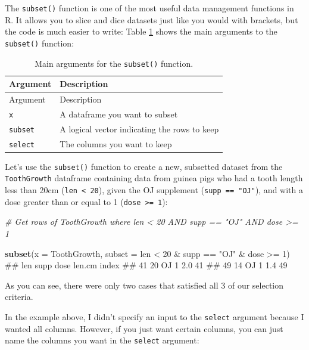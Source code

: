 \documentclass[]{book}
\newenvironment{Shaded}{\begin{snugshade}}{\end{snugshade}}
\newcommand{\KeywordTok}[1]{\textcolor[rgb]{0.13,0.29,0.53}{\textbf{{#1}}}}
\newcommand{\DataTypeTok}[1]{\textcolor[rgb]{0.13,0.29,0.53}{{#1}}}
\newcommand{\DecValTok}[1]{\textcolor[rgb]{0.00,0.00,0.81}{{#1}}}
\newcommand{\StringTok}[1]{\textcolor[rgb]{0.31,0.60,0.02}{{#1}}}
\newcommand{\CommentTok}[1]{\textcolor[rgb]{0.56,0.35,0.01}{\textit{{#1}}}}
\newcommand{\NormalTok}[1]{{#1}}
\theoremstyle{definition}
\theoremstyle{definition}
\theoremstyle{remark}
\begin{document}
The \texttt{subset()} function is one of the most useful data management
functions in R. It allows you to slice and dice datasets just like you
would with brackets, but the code is much easier to write: Table
\ref{tab:subsetfunction} shows the main arguments to the
\texttt{subset()} function:

\begin{longtable}[]{@{}ll@{}}
\caption{\label{tab:subsetfunction} Main arguments for the \texttt{subset()}
function.}\tabularnewline
\toprule
Argument & Description\tabularnewline
\midrule
\endfirsthead
\toprule
Argument & Description\tabularnewline
\midrule
\endhead
\texttt{x} & A dataframe you want to subset\tabularnewline
\texttt{subset} & A logical vector indicating the rows to
keep\tabularnewline
\texttt{select} & The columns you want to keep\tabularnewline
\bottomrule
\end{longtable}

Let's use the \texttt{subset()} function to create a new, subsetted
dataset from the \texttt{ToothGrowth} dataframe containing data from
guinea pigs who had a tooth length less than 20cm
(\texttt{len\ \textless{}\ 20}), given the OJ supplement
(\texttt{supp\ ==\ "OJ"}), and with a dose greater than or equal to 1
(\texttt{dose\ \textgreater{}=\ 1}):

\begin{Shaded}
\begin{Highlighting}[]
\CommentTok{# Get rows of ToothGrowth where len < 20 AND supp == "OJ" AND dose >= 1}

\KeywordTok{subset}\NormalTok{(}\DataTypeTok{x =} \NormalTok{ToothGrowth,}
      \DataTypeTok{subset =} \NormalTok{len <}\StringTok{ }\DecValTok{20} \NormalTok{&}
\StringTok{               }\NormalTok{supp ==}\StringTok{ "OJ"} \NormalTok{&}
\StringTok{               }\NormalTok{dose >=}\StringTok{ }\DecValTok{1}\NormalTok{)}
\NormalTok{##    len supp dose len.cm index}
\NormalTok{## 41  20   OJ    1    2.0    41}
\NormalTok{## 49  14   OJ    1    1.4    49}
\end{Highlighting}
\end{Shaded}

As you can see, there were only two cases that satisfied all 3 of our
selection criteria.

In the example above, I didn't specify an input to the \texttt{select}
argument because I wanted all columns. However, if you just want certain
columns, you can just name the columns you want in the \texttt{select}
argument:
\end{document}
